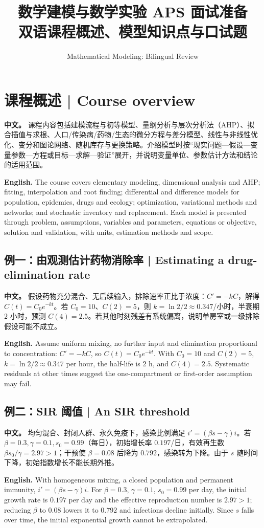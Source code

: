 \documentclass[UTF8,11pt,a4paper]{ctexart}
\title{数学建模与数学实验 APS 面试准备\\[4pt]\large 双语课程概述、模型知识点与口试题}
\author{Mathematical Modeling: Bilingual Review}
\date{}
\newcommand{\APS}[2]{\par\noindent\textbf{中文。} #1\par\noindent\textbf{English.} #2\par\smallskip}
\begin{document}
\maketitle
\section*{课程概述 | Course overview}
\APS{课程内容包括建模流程与初等模型、量纲分析与层次分析法（AHP）、拟合插值与求根、人口/传染病/药物/生态的微分方程与差分模型、线性与非线性优化、变分和图论网络、随机库存与更换策略。介绍模型时按“现实问题—假设—变量参数—方程或目标—求解—验证”展开，并说明变量单位、参数估计方法和结论的适用范围。}{The course covers elementary modeling, dimensional analysis and AHP; fitting, interpolation and root finding; differential and difference models for population, epidemics, drugs and ecology; optimization, variational methods and networks; and stochastic inventory and replacement. Each model is presented through problem, assumptions, variables and parameters, equations or objective, solution and validation, with units, estimation methods and scope.}
\subsection*{例一：由观测估计药物消除率 | Estimating a drug-elimination rate}
\APS{假设药物充分混合、无后续输入，排除速率正比于浓度：$C'=-kC$，解得 $C(t)=C_0e^{-kt}$。若 $C_0=10$、$C(2)=5$，则 $k=\ln2/2\approx0.347$/小时，半衰期 $2$ 小时，预测 $C(4)=2.5$。若其他时刻残差有系统偏离，说明单房室或一级排除假设可能不成立。}{Assume uniform mixing, no further input and elimination proportional to concentration: $C'=-kC$, so $C(t)=C_0e^{-kt}$. With $C_0=10$ and $C(2)=5$, $k=\ln2/2\approx0.347$ per hour, the half-life is $2$ h, and $C(4)=2.5$. Systematic residuals at other times suggest the one-compartment or first-order assumption may fail.}
\subsection*{例二：SIR 阈值 | An SIR threshold}
\APS{均匀混合、封闭人群、永久免疫下，感染比例满足 $i'=(\beta s-\gamma)i$。若 $\beta=0.3,\gamma=0.1,s_0=0.99$（每日），初始增长率 $0.197$/日，有效再生数 $\beta s_0/\gamma=2.97>1$；干预使 $\beta=0.08$ 后降为 $0.792$，感染转为下降。由于 $s$ 随时间下降，初始指数增长不能长期外推。}{With homogeneous mixing, a closed population and permanent immunity, $i'=(\beta s-\gamma)i$. For $\beta=0.3$, $\gamma=0.1$, $s_0=0.99$ per day, the initial growth rate is $0.197$ per day and the effective reproduction number is $2.97>1$; reducing $\beta$ to $0.08$ lowers it to $0.792$ and infections decline initially. Since $s$ falls over time, the initial exponential growth cannot be extrapolated.}
\end{document}
